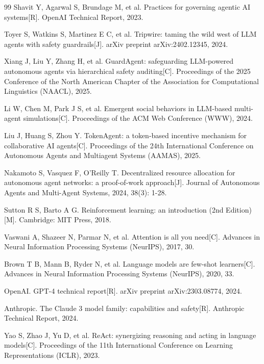 \documentclass[12pt,a4paper]{ctexart}
\begin{document}
\begin{thebibliography}{99}
Shavit Y, Agarwal S, Brundage M, et al. Practices for governing agentic AI systems[R]. OpenAI Technical Report, 2023.

Toyer S, Watkins S, Martinez E C, et al. Tripwire: taming the wild west of LLM agents with safety guardrails[J]. arXiv preprint arXiv:2402.12345, 2024.

Xiang J, Liu Y, Zhang H, et al. GuardAgent: safeguarding LLM-powered autonomous agents via hierarchical safety auditing[C]. Proceedings of the 2025 Conference of the North American Chapter of the Association for Computational Linguistics (NAACL), 2025.

Li W, Chen M, Park J S, et al. Emergent social behaviors in LLM-based multi-agent simulations[C]. Proceedings of the ACM Web Conference (WWW), 2024.

Liu J, Huang S, Zhou Y. TokenAgent: a token-based incentive mechanism for collaborative AI agents[C]. Proceedings of the 24th International Conference on Autonomous Agents and Multiagent Systems (AAMAS), 2025.

Nakamoto S, Vasquez F, O'Reilly T. Decentralized resource allocation for autonomous agent networks: a proof-of-work approach[J]. Journal of Autonomous Agents and Multi-Agent Systems, 2024, 38(3): 1-28.

Sutton R S, Barto A G. Reinforcement learning: an introduction (2nd Edition)[M]. Cambridge: MIT Press, 2018.

Vaswani A, Shazeer N, Parmar N, et al. Attention is all you need[C]. Advances in Neural Information Processing Systems (NeurIPS), 2017, 30.

Brown T B, Mann B, Ryder N, et al. Language models are few-shot learners[C]. Advances in Neural Information Processing Systems (NeurIPS), 2020, 33.

OpenAI. GPT-4 technical report[R]. arXiv preprint arXiv:2303.08774, 2024.

Anthropic. The Claude 3 model family: capabilities and safety[R]. Anthropic Technical Report, 2024.

Yao S, Zhao J, Yu D, et al. ReAct: synergizing reasoning and acting in language models[C]. Proceedings of the 11th International Conference on Learning Representations (ICLR), 2023.


\end{thebibliography}
\end{document}
